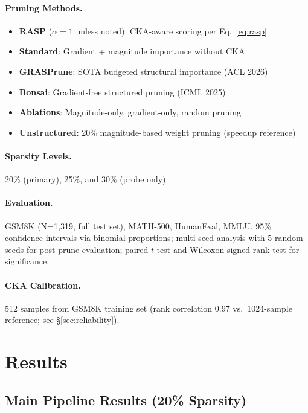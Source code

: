 \documentclass[11pt]{article}
\begin{document}
\paragraph{Pruning Methods.}
\begin{itemize}
\item \textbf{RASP} ($\alpha{=}1$ unless noted): CKA-aware scoring per Eq.~\ref{eq:rasp}
\item \textbf{Standard}: Gradient + magnitude importance without CKA
\item \textbf{GRASPrune}: SOTA budgeted structural importance (ACL 2026)
\item \textbf{Bonsai}: Gradient-free structured pruning (ICML 2025)
\item \textbf{Ablations}: Magnitude-only, gradient-only, random pruning
\item \textbf{Unstructured}: 20\% magnitude-based weight pruning (speedup reference)
\end{itemize}

\paragraph{Sparsity Levels.} 20\% (primary), 25\%, and 30\% (probe only).

\paragraph{Evaluation.} GSM8K (N=1,319, full test set), MATH-500, HumanEval, MMLU. 95\% confidence intervals via binomial proportions; multi-seed analysis with 5 random seeds for post-prune evaluation; paired $t$-test and Wilcoxon signed-rank test for significance.

\paragraph{CKA Calibration.} 512 samples from GSM8K training set (rank correlation 0.97 vs.\ 1024-sample reference; see \S\ref{sec:reliability}).

\section{Results}
\label{sec:results}

\subsection{Main Pipeline Results (20\% Sparsity)}
\label{sec:main}
\end{document}
